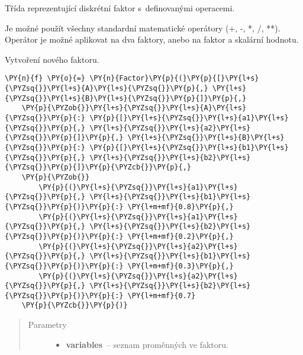\begin{fulllineitems}
\label{alex.infer:alex.infer.factor.Factor}
Třída reprezentující diskrétní faktor s~definovanými operacemi.

Je možné použít všechny standardní matematické operátory (+, -, *, /,
**). Operátor je možné aplikovat na dva faktory, anebo na faktor a
skalární hodnotu.

\begin{fulllineitems}
\label{alex.infer:alex.infer.factor.Factor.__init__}
Vytvoření nového faktoru.

\begin{Verbatim}[commandchars=\\\{\}]
\PY{n}{f} \PY{o}{=} \PY{n}{Factor}\PY{p}{(}\PY{p}{[}\PY{l+s}{\PYZsq{}}\PY{l+s}{A}\PY{l+s}{\PYZsq{}}\PY{p}{,} \PY{l+s}{\PYZsq{}}\PY{l+s}{B}\PY{l+s}{\PYZsq{}}\PY{p}{]}\PY{p}{,}
    \PY{p}{\PYZob{}}\PY{l+s}{\PYZsq{}}\PY{l+s}{A}\PY{l+s}{\PYZsq{}}\PY{p}{:} \PY{p}{[}\PY{l+s}{\PYZsq{}}\PY{l+s}{a1}\PY{l+s}{\PYZsq{}}\PY{p}{,} \PY{l+s}{\PYZsq{}}\PY{l+s}{a2}\PY{l+s}{\PYZsq{}}\PY{p}{]}\PY{p}{,} \PY{l+s}{\PYZsq{}}\PY{l+s}{B}\PY{l+s}{\PYZsq{}}\PY{p}{:} \PY{p}{[}\PY{l+s}{\PYZsq{}}\PY{l+s}{b1}\PY{l+s}{\PYZsq{}}\PY{p}{,} \PY{l+s}{\PYZsq{}}\PY{l+s}{b2}\PY{l+s}{\PYZsq{}}\PY{p}{]}\PY{p}{\PYZcb{}}\PY{p}{,}
    \PY{p}{\PYZob{}}
        \PY{p}{(}\PY{l+s}{\PYZsq{}}\PY{l+s}{a1}\PY{l+s}{\PYZsq{}}\PY{p}{,} \PY{l+s}{\PYZsq{}}\PY{l+s}{b1}\PY{l+s}{\PYZsq{}}\PY{p}{)}\PY{p}{:} \PY{l+m+mf}{0.8}\PY{p}{,}
        \PY{p}{(}\PY{l+s}{\PYZsq{}}\PY{l+s}{a1}\PY{l+s}{\PYZsq{}}\PY{p}{,} \PY{l+s}{\PYZsq{}}\PY{l+s}{b2}\PY{l+s}{\PYZsq{}}\PY{p}{)}\PY{p}{:} \PY{l+m+mf}{0.2}\PY{p}{,}
        \PY{p}{(}\PY{l+s}{\PYZsq{}}\PY{l+s}{a2}\PY{l+s}{\PYZsq{}}\PY{p}{,} \PY{l+s}{\PYZsq{}}\PY{l+s}{b1}\PY{l+s}{\PYZsq{}}\PY{p}{)}\PY{p}{:} \PY{l+m+mf}{0.3}\PY{p}{,}
        \PY{p}{(}\PY{l+s}{\PYZsq{}}\PY{l+s}{a2}\PY{l+s}{\PYZsq{}}\PY{p}{,} \PY{l+s}{\PYZsq{}}\PY{l+s}{b2}\PY{l+s}{\PYZsq{}}\PY{p}{)}\PY{p}{:} \PY{l+m+mf}{0.7}
    \PY{p}{\PYZcb{}}\PY{p}{)}
\end{Verbatim}
\begin{quote}\begin{description}
\item[{Parametry}] \leavevmode\begin{itemize}
\item {} 
\textbf{variables}~-- seznam proměnných ve faktoru.


\end{itemize}
\end{description}
\end{quote}
\end{fulllineitems}
\end{fulllineitems}
